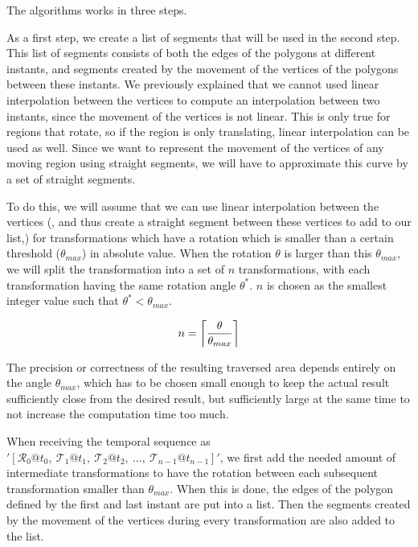 
The algorithms works in three steps.

As a first step, we create a list of segments that will be used in the second step. This list of segments consists of both the edges of the polygons at different instants, and segments created by the movement of the vertices of the polygons between these instants. We previously explained that we cannot used linear interpolation between the vertices to compute an interpolation between two instants, since the movement of the vertices is not linear. This is only true for regions that rotate, so if the region is only translating, linear interpolation can be used as well. Since we want to represent the movement of the vertices of any moving region using straight segments, we will have to approximate this curve by a set of straight segments. 

To do this, we will assume that we can use linear interpolation between the vertices (, and thus create a straight segment between these vertices to add to our list,) for transformations which have a rotation which is smaller than a certain threshold ($\theta_{max}$) in absolute value. When the rotation $\theta$ is larger than this $\theta_{max}$, we will split the transformation into a set of $n$ transformations, with each transformation having the same rotation angle $\theta^*$. $n$ is chosen as the smallest integer value such that $\theta^* < \theta_{max}$.

\[
    n = \ceil*{\frac{\theta}{\theta_{max}}}
\]

The precision or correctness of the resulting traversed area depends entirely on the angle $\theta_{max}$, which has to be chosen small enough to keep the actual result sufficiently close from the desired result, but sufficiently large at the same time to not increase the computation time too much.

When receiving the temporal sequence as $'[\mathcal{R}_0@t_0,\ \mathcal{T}_1@t_1,\ \mathcal{T}_2@t_2,\ ...,\ \mathcal{T}_{n-1}@t_{n-1}]'$, we first add the needed amount of intermediate transformations to have the rotation between each subsequent transformation smaller than $\theta_{max}$. When this is done, the edges of the polygon defined by the first and last instant are put into a list. Then the segments created by the movement of the vertices during every transformation are also added to the list.


